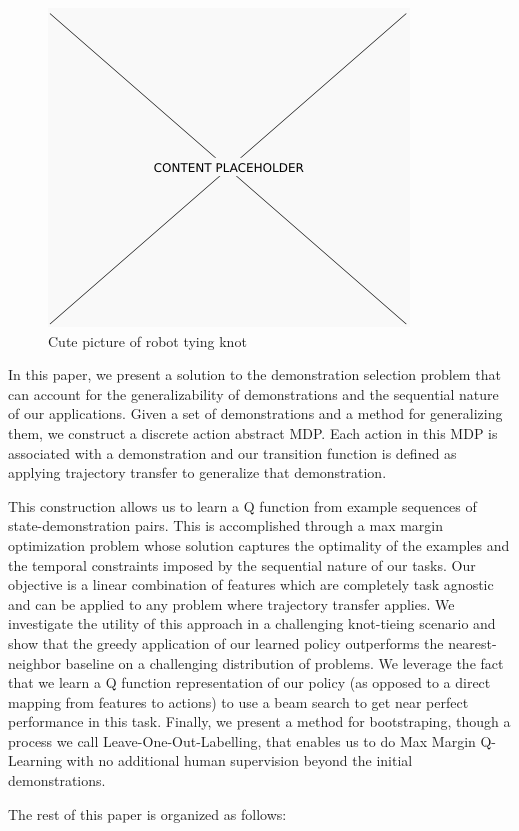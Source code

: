 \begin{figure}[t]
  \centering
    \includegraphics[width=0.9\linewidth]{figures/placeholder.png}
  \caption{Cute picture of robot tying knot}
  \label{fig:frontfig}
\end{figure}

In this paper, we present a solution to the demonstration selection problem that can account for the generalizability of demonstrations and the sequential nature of our applications.
Given a set of demonstrations and a method for generalizing them, we construct a discrete action abstract MDP.
Each action in this MDP is associated with a demonstration and our transition function is defined as applying trajectory transfer to generalize that demonstration.

This construction allows us to learn a Q function from example sequences of state-demonstration pairs.
This is accomplished through a max margin optimization problem whose solution captures the optimality of the examples and the temporal constraints imposed by the sequential nature of our tasks.
Our objective is a linear combination of features which are completely task agnostic and can be applied to any problem where trajectory transfer applies. 
We investigate the utility of this approach in a challenging knot-tieing scenario and show that the greedy application of our learned policy outperforms the nearest-neighbor baseline on a challenging distribution of problems. 
We leverage the fact that we learn a Q function representation of our policy (as opposed to a direct mapping from features to actions) to use a beam search to get near perfect performance in this task.
Finally, we present a method for bootstraping, though a process we call Leave-One-Out-Labelling, that enables us to do Max Margin Q-Learning with no additional human supervision beyond the initial demonstrations.

The rest of this paper is organized as follows: 



